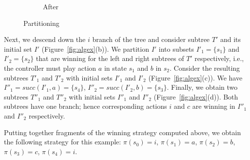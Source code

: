\begin{example}
\begin{figure}
\begin{subfigure}[t]{.3\textwidth}
\begin{minipage}[t][3cm][t]{\textwidth}
        \end{minipage}
        \caption{After}
    \end{subfigure}%
    \hspace*{\fill}
    \caption{Partitioning}
    \label{fig:partition}
\end{figure}


Next, we descend down the $i$ branch of the tree and consider subtree $T'$ and its initial set $I'$ (Figure~\ref{fig:algex}(b)).  We partition $I'$ into subsets $I'_1=\{s_1\}$ and $I'_2=\{s_2\}$ that are winning for the left and right subtrees of $T'$ respectively, i.e., the controller must play action $a$ in state $s_1$ and $b$ in $s_2$.  Consider the resulting subtrees $T'_1$ and $T'_2$ with initial sets $I'_1$ and $I'_2$ (Figure~\ref{fig:algex}(c)).  We have $I''_1 = succ(I'_1, a) = \{s_4\}$, $I''_2 = succ(I'_2, b) = \{s_3\}$.  Finally, we obtain two subtrees $T''_1$ and $T''_2$ with initial sets $I''_1$ and $I''_2$ (Figure~\ref{fig:algex}(d)).  Both subtrees have one branch; hence corresponding actions $i$ and $c$ are winning in $I''_1$ and $I''_2$ respectively.

Putting together fragments of the winning strategy computed above, 
we obtain the following strategy for this example: $\pi(s_0)=i$, 
$\pi(s_1)=a$, $\pi(s_2)=b$, $\pi(s_3)=c$, $\pi(s_4)=i$.
\end{example}


